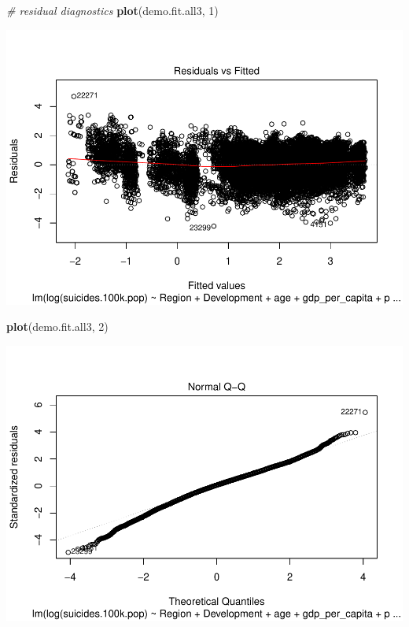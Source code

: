 \documentclass[11pt,]{article}
\newenvironment{Shaded}{\begin{snugshade}}{\end{snugshade}}
\newcommand{\CommentTok}[1]{\textcolor[rgb]{0.56,0.35,0.01}{\textit{#1}}}
\newcommand{\DecValTok}[1]{\textcolor[rgb]{0.00,0.00,0.81}{#1}}
\newcommand{\KeywordTok}[1]{\textcolor[rgb]{0.13,0.29,0.53}{\textbf{#1}}}
\newcommand{\NormalTok}[1]{#1}
\begin{document}
\begin{Shaded}
\begin{Highlighting}[]
\CommentTok{# residual diagnostics}
\KeywordTok{plot}\NormalTok{(demo.fit.all3, }\DecValTok{1}\NormalTok{)}
\end{Highlighting}
\end{Shaded}

\includegraphics{An-Analysis-of-Suicide-Data_files/figure-latex/unnamed-chunk-3-1.pdf}

\begin{Shaded}
\begin{Highlighting}[]
\KeywordTok{plot}\NormalTok{(demo.fit.all3, }\DecValTok{2}\NormalTok{)}
\end{Highlighting}
\end{Shaded}

\includegraphics{An-Analysis-of-Suicide-Data_files/figure-latex/unnamed-chunk-3-2.pdf}
\end{document}
